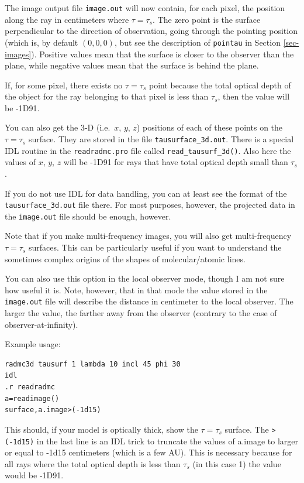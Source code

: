 \documentclass{report}
\newenvironment{asciibox}%
  {\begin{list}{}{%
    \setlength{\topsep}{0.5em}%
    \setlength{\parskip}{0em}%
    \setlength{\parsep}{0em}%
    \setlength{\itemsep}{0em}%
    \setlength{\rightmargin}{0em}%
    \setlength{\leftmargin}{3.0em}%
    \setlength{\labelsep}{1em}%
    \setlength{\labelwidth}{2em}%
  }\normalfont\footnotesize\item}
  {\end{list}}
\begin{document}
The image output file {\small\tt image.out} will now contain, for each
pixel, the position along the ray in centimeters where $\tau=\tau_s$. The
zero point is the surface perpendicular to the direction of observation,
going through the pointing position (which is, by default $(0,0,0)$, but see
the description of {\small\tt pointau} in Section
\ref{sec-images}). Positive values mean that the surface is closer to the
observer than the plane, while negative values mean that the surface is
behind the plane.

If, for some pixel, there exists no $\tau=\tau_s$ point because the total
optical depth of the object for the ray belonging to that pixel is less
than $\tau_s$, then the value will be -1D91. 

You can also get the 3-D (i.e.~$x$, $y$, $z$) positions of each of these
points on the $\tau=\tau_s$ surface. They are stored in the file
{\small\tt tausurface\_3d.out}. There is a special IDL routine in the
{\small\tt readradmc.pro} file called {\small\tt read\_tausurf\_3d()}.
Also here the values of $x$, $y$, $z$ will be -1D91 for rays that
have total optical depth small than $\tau_s$.

If you do not use IDL for data handling, you can at least see the format
of the {\small\tt tausurface\_3d.out} file there. For most purposes, 
however, the projected data in the {\small\tt image.out} file should
be enough, however.

Note that if you make multi-frequency images, you will also get
multi-frequency $\tau=\tau_s$ surfaces. This can be particularly useful if
you want to understand the sometimes complex origins of the shapes of
molecular/atomic lines.

You can also use this option in the local observer mode, though I am not
sure how useful it is. Note, however, that in that mode the value stored in
the {\small\tt image.out} file will describe the distance in centimeter to
the local observer. The larger the value, the farther away from the observer
(contrary to the case of observer-at-infinity).

Example usage:
\begin{asciibox}\begin{verbatim}
radmc3d tausurf 1 lambda 10 incl 45 phi 30
idl
.r readradmc
a=readimage()
surface,a.image>(-1d15)
\end{verbatim}\end{asciibox}
This should, if your model is optically thick, show the $\tau=\tau_s$
surface. The {\small\tt >(-1d15)} in the last line is an IDL trick to
truncate the values of a.image to larger or equal to -1d15 centimeters
(which is a few AU). This is necessary because for all rays where the
total optical depth is less than $\tau_s$ (in this case 1) the value
would be -1D91.
\end{document}
